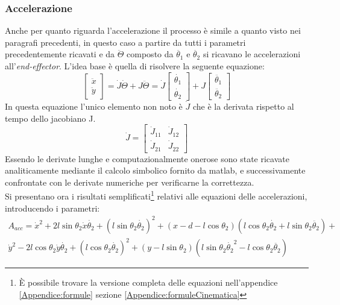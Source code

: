 \subsubsection{Accelerazione}
Anche per quanto riguarda l'accelerazione il processo è simile a quanto visto nei paragrafi precedenti, in questo caso a partire da tutti i parametri precedentemente ricavati e da $\ddot{\Theta}$ composto da $\ddot{\theta_1}$ e $\ddot{\theta_2}$ si ricavano le accelerazioni all'\textit{end-effector}. L'idea base è quella di risolvere la seguente equazione:
\begin{equation}
	\begin{bmatrix}
		\ddot{x} \\ \ddot{y}
	\end{bmatrix} = \dot{J}\dot{\Theta} + J\ddot{\Theta} = \dot{J}\begin{bmatrix}
	\dot{\theta_1} \\ \dot{\theta_2}
\end{bmatrix} + J \begin{bmatrix}
\ddot{\theta_1} \\ \ddot{\theta_2}
\end{bmatrix}
\end{equation}
In questa equazione l'unico elemento non noto è $\dot{J}$ che è la derivata rispetto al tempo dello jacobiano J.
\begin{equation*}
	\dot{J} = \begin{bmatrix}
		\dot{J}_{11} & \dot{J}_{12} \\
	\dot{J}_{21} & \dot{J}_{22}
	\end{bmatrix}
\end{equation*}
Essendo le derivate lunghe e computazionalmente onerose sono state ricavate analiticamente mediante il calcolo simbolico fornito da matlab, e successivamente confrontate con le derivate numeriche per verificarne la correttezza. 
\\Si presentano ora i risultati semplificati\footnote{È possibile trovare la versione completa delle equazioni nell'appendice \ref{Appendice:formule} sezione \ref{Appendice:formuleCinematica}} relativi alle equazioni delle accelerazioni, introducendo i parametri:
\begin{equation*}
\begin{aligned}
    A_{acc} = \dot{x}^2 + 2l\sin\theta_2\dot{x}\dot{\theta_2}+(l\sin\theta_2\dot{\theta_2})^2 + (x-d-l\cos\theta_2)(l\cos\theta_2\dot{\theta_2}+l\sin\theta_2\ddot{\theta_2}) +\\ \dot{y}^2-2l\cos\theta_2\dot{y}\dot{\theta_2}+(l\cos\theta_2\dot{\theta_2})^2+(y-l\sin\theta_2)(l\sin\theta_2\dot{\theta_2}^2-l\cos\theta_2\ddot{\theta_2})
    \end{aligned}
\end{equation*}
